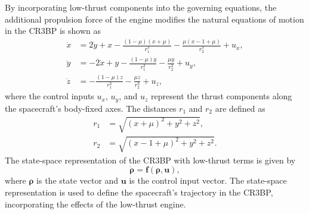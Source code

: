 \documentclass[conference]{IEEEtran}
\begin{document}
 By incorporating low-thrust components into the governing equations, the additional propulsion force of the engine modifies the natural equations of motion in the CR3BP is shown as
\begin{align}
		\ddot{x} &= 2\dot{y} + x - \frac{(1-\mu)(x+\mu)}{r_1^3} - \frac{\mu(x-1+\mu)}{r_2^3} + u_x, \\
		\ddot{y} &= -2\dot{x} + y - \frac{(1-\mu)y}{r_1^3} - \frac{\mu y}{r_2^3} + u_y, \\
		\ddot{z} &= -\frac{(1-\mu)z}{r_1^3} - \frac{\mu z}{r_2^3} + u_z,
\end{align}
where the control inputs \( u_x \), \( u_y \), and \( u_z \) represent the thrust components along the spacecraft's body-fixed axes. The distances \( r_1 \) and \( r_2 \) are defined as
\begin{align}
	r_1 &= \sqrt{(x+\mu)^2 + y^2 + z^2}, \\
	r_2 &= \sqrt{(x-1+\mu)^2 + y^2 + z^2}.
\end{align}
The state-space representation of the CR3BP with low-thrust terms is given by
\begin{equation}
	\dot{\boldsymbol{\rho}} = \boldsymbol{f}(\boldsymbol{\rho}, \boldsymbol{u}),
\end{equation}
where \( \boldsymbol{\rho} \) is the state vector and \( \boldsymbol{u} \) is the control input vector. The state-space representation is used to define the spacecraft's trajectory in the CR3BP, incorporating the effects of the low-thrust engine.
\end{document}
